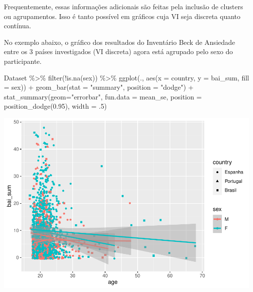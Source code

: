 \documentclass[
]{book}
\newenvironment{Shaded}{\begin{snugshade}}{\end{snugshade}}
\newcommand{\AttributeTok}[1]{\textcolor[rgb]{0.77,0.63,0.00}{#1}}
\newcommand{\DecValTok}[1]{\textcolor[rgb]{0.00,0.00,0.81}{#1}}
\newcommand{\FloatTok}[1]{\textcolor[rgb]{0.00,0.00,0.81}{#1}}
\newcommand{\FunctionTok}[1]{\textcolor[rgb]{0.00,0.00,0.00}{#1}}
\newcommand{\NormalTok}[1]{#1}
\newcommand{\SpecialCharTok}[1]{\textcolor[rgb]{0.00,0.00,0.00}{#1}}
\newcommand{\StringTok}[1]{\textcolor[rgb]{0.31,0.60,0.02}{#1}}
\begin{document}
Frequentemente, essas informações adicionais são feitas pela inclusão de clusters ou agrupamentos. Isso é tanto possível em gráficos cuja VI seja discreta quanto contínua.

No exemplo abaixo, o gráfico dos resultados do Inventário Beck de Ansiedade entre os 3 países investigados (VI discreta) agora está agrupado pelo sexo do participante.

\begin{Shaded}
\begin{Highlighting}[]
\NormalTok{Dataset }\SpecialCharTok{\%\textgreater{}\%} 
  \FunctionTok{filter}\NormalTok{(}\SpecialCharTok{!}\FunctionTok{is.na}\NormalTok{(sex)) }\SpecialCharTok{\%\textgreater{}\%} 
  \FunctionTok{ggplot}\NormalTok{(., }\FunctionTok{aes}\NormalTok{(}\AttributeTok{x =}\NormalTok{ country, }\AttributeTok{y =}\NormalTok{ bai\_sum, }\AttributeTok{fill =}\NormalTok{ sex)) }\SpecialCharTok{+}
  \FunctionTok{geom\_bar}\NormalTok{(}\AttributeTok{stat =} \StringTok{"summary"}\NormalTok{, }\AttributeTok{position =} \StringTok{"dodge"}\NormalTok{) }\SpecialCharTok{+}
  \FunctionTok{stat\_summary}\NormalTok{(}\AttributeTok{geom=}\StringTok{"errorbar"}\NormalTok{, }\AttributeTok{fun.data =}\NormalTok{ mean\_se, }
               \AttributeTok{position =} \FunctionTok{position\_dodge}\NormalTok{(}\FloatTok{0.95}\NormalTok{), }\AttributeTok{width =}\NormalTok{ .}\DecValTok{5}\NormalTok{) }
\end{Highlighting}
\end{Shaded}

\begin{center}\includegraphics{gitbook-demo_files/figure-latex/unnamed-chunk-27-1} \end{center}
\end{document}
